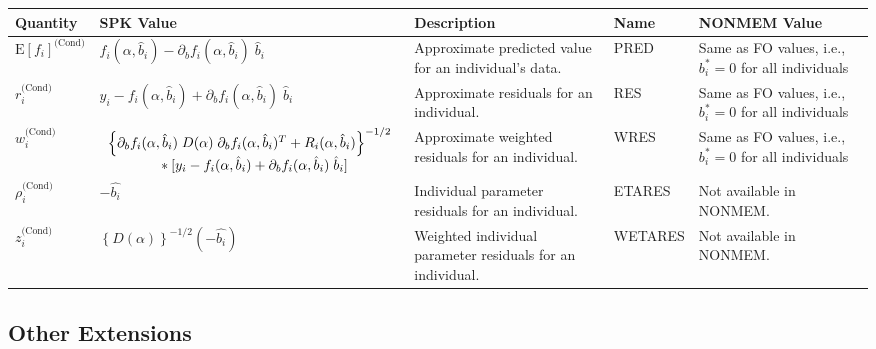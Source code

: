 \documentclass{article}
\begin{document}
\begin{center}
\begin{tabular}{|p{0.75in}|p{3.25in}|p{1.1in}|p{0.85in}|p{1.0in}|}
\hline
\hline
  {\bf Quantity}
    & {\bf SPK Value}
    & {\bf Description}
    & {\bf Name}
    & {\bf NONMEM Value} \\
  \hline
  \hline
  $\mbox{E} \left[ f_i \right]^{\mbox{(Cond)}}$
    & $f_i(\alpha, \hat{b}_i) - \partial_b f_i(\alpha, \hat{b}_i) \; \hat{b}_i$
    & Approximate predicted value for an individual's data.
    & PRED 
    & Same as FO values, i.e., $b^{\ast}_i = 0$ for all individuals\\
  \hline
  $r^{\mbox{(Cond)}}_i$
    & $y_i - f_i(\alpha, \hat{b}_i) + \partial_b f_i(\alpha, \hat{b}_i) \; \hat{b}_i$
    & Approximate residuals for an individual.
    & RES 
    & Same as FO values, i.e., $b^{\ast}_i = 0$ for all individuals\\
  \hline
  $w^{\mbox{(Cond)}}_i$
    & $\begin{array}{l}
        \left\{ \partial_b f_i(\alpha, \hat{b}_i) \;
          D(\alpha) \; \partial_b f_i(\alpha, \hat{b}_i)^T
          + R_i(\alpha, \hat{b}_i) \right\}^{-1/2} \\
        \mbox{\hspace{0.5in}}
        \ast [ y_i - f_i(\alpha, \hat{b}_i) 
           + \partial_b f_i(\alpha, \hat{b}_i) \; \hat{b}_i ]
      \end{array} $
    & Approximate weighted residuals for an individual.
    & WRES 
    & Same as FO values, i.e., $b^{\ast}_i = 0$ for all individuals\\
  \hline
  $\rho^{\mbox{(Cond)}}_i$
    & $-\hat{b_i}$
    & Individual parameter residuals for an individual.
    & ETARES
    & Not available in NONMEM. \\
  \hline
  $z^{\mbox{(Cond)}}_i$
    & $\left\{ D(\alpha) \right\}^{-1/2} ( - \hat{b_i} )$
    & Weighted individual parameter residuals for an individual.
    & WETARES
    & Not available in NONMEM. \\
  \hline
  \hline
\end{tabular}
\end{center}


\subsection{Other Extensions}
\end{document}
